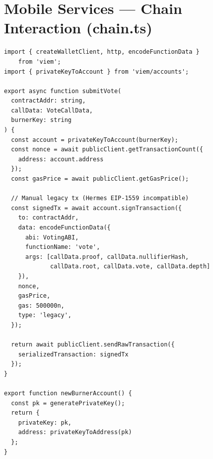 \section{Mobile Services --- Chain Interaction (chain.ts)}

\begin{lstlisting}[caption={Legacy transaction signing for Hermes compatibility}]
import { createWalletClient, http, encodeFunctionData }
    from 'viem';
import { privateKeyToAccount } from 'viem/accounts';

export async function submitVote(
  contractAddr: string,
  callData: VoteCallData,
  burnerKey: string
) {
  const account = privateKeyToAccount(burnerKey);
  const nonce = await publicClient.getTransactionCount({
    address: account.address
  });
  const gasPrice = await publicClient.getGasPrice();

  // Manual legacy tx (Hermes EIP-1559 incompatible)
  const signedTx = await account.signTransaction({
    to: contractAddr,
    data: encodeFunctionData({
      abi: VotingABI,
      functionName: 'vote',
      args: [callData.proof, callData.nullifierHash,
             callData.root, callData.vote, callData.depth]
    }),
    nonce,
    gasPrice,
    gas: 500000n,
    type: 'legacy',
  });

  return await publicClient.sendRawTransaction({
    serializedTransaction: signedTx
  });
}

export function newBurnerAccount() {
  const pk = generatePrivateKey();
  return {
    privateKey: pk,
    address: privateKeyToAddress(pk)
  };
}
\end{lstlisting}
